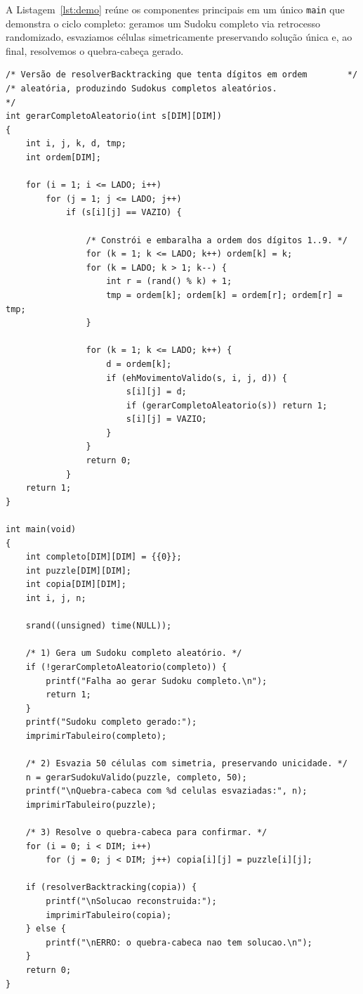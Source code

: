 \documentclass[11pt,a4paper,oneside]{report}
\newcommand{\codigo}[1]{\texttt{\color{deitelblue}#1}}
\begin{document}
A Listagem~\ref{lst:demo} reúne os componentes principais em um único
\codigo{main} que demonstra o ciclo completo: geramos um Sudoku
completo via retrocesso randomizado, esvaziamos células simetricamente
preservando solução única e, ao final, resolvemos o quebra-cabeça
gerado.

\begin{lstlisting}[caption={Programa integrado.},label={lst:demo}]
/* Versão de resolverBacktracking que tenta dígitos em ordem        */
/* aleatória, produzindo Sudokus completos aleatórios.               */
int gerarCompletoAleatorio(int s[DIM][DIM])
{
    int i, j, k, d, tmp;
    int ordem[DIM];

    for (i = 1; i <= LADO; i++)
        for (j = 1; j <= LADO; j++)
            if (s[i][j] == VAZIO) {

                /* Constrói e embaralha a ordem dos dígitos 1..9. */
                for (k = 1; k <= LADO; k++) ordem[k] = k;
                for (k = LADO; k > 1; k--) {
                    int r = (rand() % k) + 1;
                    tmp = ordem[k]; ordem[k] = ordem[r]; ordem[r] = tmp;
                }

                for (k = 1; k <= LADO; k++) {
                    d = ordem[k];
                    if (ehMovimentoValido(s, i, j, d)) {
                        s[i][j] = d;
                        if (gerarCompletoAleatorio(s)) return 1;
                        s[i][j] = VAZIO;
                    }
                }
                return 0;
            }
    return 1;
}

int main(void)
{
    int completo[DIM][DIM] = {{0}};
    int puzzle[DIM][DIM];
    int copia[DIM][DIM];
    int i, j, n;

    srand((unsigned) time(NULL));

    /* 1) Gera um Sudoku completo aleatório. */
    if (!gerarCompletoAleatorio(completo)) {
        printf("Falha ao gerar Sudoku completo.\n");
        return 1;
    }
    printf("Sudoku completo gerado:");
    imprimirTabuleiro(completo);

    /* 2) Esvazia 50 células com simetria, preservando unicidade. */
    n = gerarSudokuValido(puzzle, completo, 50);
    printf("\nQuebra-cabeca com %d celulas esvaziadas:", n);
    imprimirTabuleiro(puzzle);

    /* 3) Resolve o quebra-cabeca para confirmar. */
    for (i = 0; i < DIM; i++)
        for (j = 0; j < DIM; j++) copia[i][j] = puzzle[i][j];

    if (resolverBacktracking(copia)) {
        printf("\nSolucao reconstruida:");
        imprimirTabuleiro(copia);
    } else {
        printf("\nERRO: o quebra-cabeca nao tem solucao.\n");
    }
    return 0;
}
\end{lstlisting}
\end{document}
